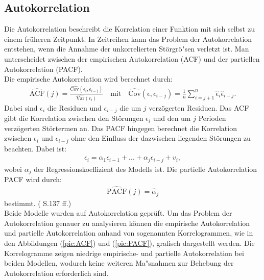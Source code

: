\documentclass[12pt]{scrreprt}
\begin{document}
\subsection{Autokorrelation}
Die Autokorrelation beschreibt die Korrelation einer Funktion mit sich selbst zu einem früheren Zeitpunkt. In Zeitreihen kann das Problem der Autokorrelation entstehen, wenn die Annahme der unkorrelierten Störgrö"sen verletzt ist. Man unterscheidet zwischen der empirischen Autokorrelation (ACF) und der partiellen Autokorrelation (PACF).\\
Die empirische Autokorrelation wird berechnet durch:
\begin{align}
\widehat{\text{ACF}}(j)=\frac{\widehat{\text{Cov}}(\epsilon_{i},\epsilon_{i-j})}{\widehat{\text{Var}}(\epsilon_{i})} \quad \text{mit} \quad \widehat{\text{Cov}}(\epsilon,\epsilon_{i-j})=\frac{1}{n}\sum_{i=j+1}^{n}\hat{\epsilon}_{i}\hat{\epsilon}_{i-j}.
\end{align}
Dabei sind $\epsilon_{i}$ die Residuen und $\epsilon_{i-j}$ die um $j$ verzögerten Residuen. Das ACF gibt die Korrelation zwischen den Störungen $\epsilon_{i}$ und den um $j$ Perioden verzögerten Störtermen an. Das PACF hingegen berechnet die Korrelation zwischen $\epsilon_{i}$ und $\epsilon_{i-j}$ ohne den Einfluss der dazwischen liegenden Störungen zu beachten. Dabei ist:
\begin{align}
\epsilon_{i}=\alpha_{1}\epsilon_{i-1}+...+\alpha_{j}\epsilon_{i-j}
+v_{i},
\end{align}
wobei $\alpha_{j}$ der Regressionskoeffizient des Modells ist. Die partielle Autokorrelation PACF wird durch:
\begin{align}
\widehat{\text{PACF}}(j)=\hat{\alpha}_{j}
\end{align}
bestimmt. (\cite{fahrmeir2007regression} S.137 ff.)\\
Beide Modelle wurden auf Autokorrelation geprüft. Um das Problem der Autokorrelation genauer zu analysieren können die empirische Autokorrelation und partielle Autokorrelation anhand von sogenannten Korrelogrammen, wie in den Abbildungen (\ref{pic:ACF}) und (\ref{pic:PACF}), grafisch dargestellt werden. Die  Korrelogramme zeigen niedrige empirische- und partielle Autokorrelation bei beiden Modellen, wodurch keine weiteren Ma"snahmen zur Behebung der Autokorrelation erforderlich sind.
\end{document}

